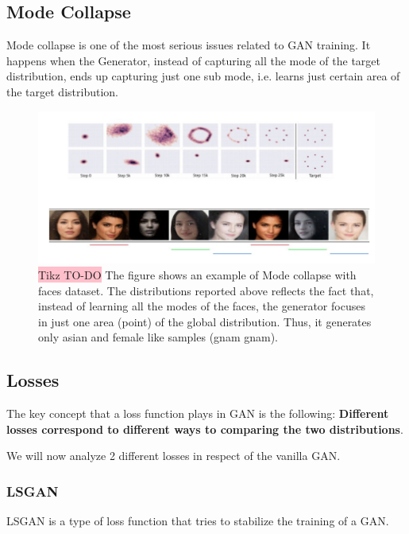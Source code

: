 \subsection{Mode Collapse}

Mode collapse is one of the most serious issues related to GAN training. It happens when the Generator, instead of capturing all the mode of the target distribution, ends up capturing just one sub mode, i.e. learns just certain area of the target distribution.


\begin{figure}[!htbp]
    \centering
    \includegraphics[width=1\linewidth]{tikz/mode collapse.png}
    \caption{{\color{red}\colorbox{pink}{Tikz TO-DO}} The figure shows an example of Mode collapse with faces dataset. The distributions reported above reflects the fact that, instead of learning all the modes of the faces, the generator focuses in just one area (point) of the global distribution. Thus, it generates only asian and female like samples (gnam gnam).}
    \label{fig:mode-collapse}
\end{figure}

\subsection{Losses}

The key concept that a loss function plays in GAN is the following: \textbf{Different losses correspond to different ways to comparing the two distributions}.

We will now analyze 2 different losses in respect of the vanilla GAN.

\subsubsection{LSGAN}

LSGAN is a type of loss function that tries to stabilize the training of a GAN.

